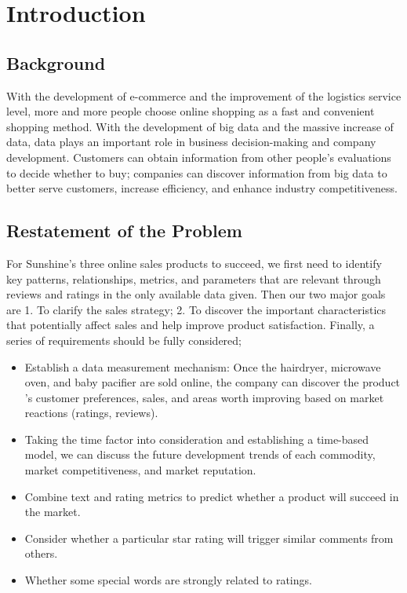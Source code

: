 \documentclass{mcmthesis}
\begin{document}
\newpage
\setcounter{page}{1}

\section{Introduction}
\subsection{Background}

With the development of e-commerce and the improvement of the logistics service level, more and more people choose online shopping as a fast and convenient shopping method. With the development of big data and the massive increase of data, data plays an important role in business decision-making and company development. Customers can obtain information from other people's evaluations to decide whether to buy; companies can discover information from big data to better serve customers, increase efficiency, and enhance industry competitiveness.

\subsection{Restatement of the Problem}

For Sunshine's three online sales products to succeed, we first need to identify key patterns, relationships, metrics, and parameters that are relevant through reviews and ratings in the only available data given. Then our two major goals are 1. To clarify the sales strategy; 2. To discover the important characteristics that potentially affect sales and help improve product satisfaction. Finally, a series of requirements should be fully considered;

\begin{itemize}

\item Establish a data measurement mechanism: Once the hairdryer, microwave oven, and baby pacifier are sold online, the company can discover the product ’s customer preferences, sales, and areas worth improving based on market reactions (ratings, reviews).

\item Taking the time factor into consideration and establishing a time-based model, we can discuss the future development trends of each commodity, market competitiveness, and market reputation.

\item Combine text and rating metrics to predict whether a product will succeed in the market.


\item Consider whether a particular star rating will trigger similar comments from others.

\item Whether some special words are strongly related to ratings.

\end{itemize}
\end{document}
